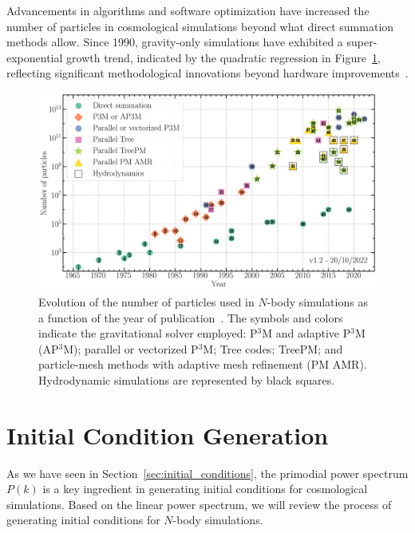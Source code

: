 Advancements in algorithms and software optimization have increased the number of particles in cosmological simulations beyond what direct summation methods allow. Since 1990, gravity-only simulations have exhibited a super-exponential growth trend, indicated by the quadratic regression in Figure~\ref{fig:particle-count}, reflecting significant methodological innovations beyond hardware improvements~\citep{leclercq2020}.

\begin{figure} \centering \includegraphics[width=\textwidth]{figures/Moore_law_cosmosims.png} \caption[Evolution of the number of particles used in $N$-body simulations]{Evolution of the number of particles used in $N$-body simulations as a function of the year of publication~\citep{leclercq2020}. The symbols and colors indicate the gravitational solver employed: P$^3$M and adaptive P$^3$M (AP$^3$M); parallel or vectorized P$^3$M; Tree codes; TreePM; and particle-mesh methods with adaptive mesh refinement (PM AMR). Hydrodynamic simulations are represented by black squares.} \label{fig:particle-count} \end{figure}

\section{Initial Condition Generation}
As we have seen in Section~\ref{sec:initial_conditions}, the primodial power spectrum $P(k)$ is a key ingredient in generating initial conditions for cosmological simulations. Based on the linear power spectrum, we will review the process of generating initial conditions for $N$-body simulations.


